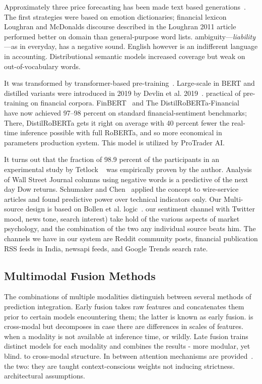 \documentclass[10pt,a4paper,twoside]{article}
\begin{document}
Approximately three price forecasting has been made text based
generations~\cite{bollen2011}. The first strategies were based on emotion
dictionaries; financial lexicon Loughran and McDonalds discourse described in the Loughran 2011 article~\cite{loughran2011}
performed better on domain than general-purpose word lists.
ambiguity---\emph{liability}---as in everyday, has a negative sound.
English however is an indifferent language in accounting. Distributional semantic models
increased coverage but weak on out-of-vocabulary words.

It was transformed by transformer-based pre-training~\cite{vaswani2017}.
Large-scale in BERT and distilled variants were introduced in 2019 by Devlin et al. 2019~\cite{devlin2019}.
practical of pre-training on financial corpora. FinBERT~\cite{araci2019} and
The DistilRoBERTa-Financial~\cite{liu2019} have now achieved 97--98 percent on standard
financial-sentiment benchmarks; There, DistilRoBERTa gets it right on average with 40 percent fewer
the real-time inference possible with full RoBERTa, and so more economical in parameters
production system. This model is utilized by ProTrader AI.

It turns out that the fraction of 98.9 percent of the participants in an experimental study by Tetlock ~\cite{tetlock2007} was empirically proven by the author.
Analysis of Wall Street Journal columns using negative words is a predictive of the next day Dow returns.
Schumaker and Chen~\cite{schumaker2009} applied the concept to wire-service
articles and found predictive power over technical indicators only. Our
Multi-source design is based on Bollen et al. logic~\cite{bollen2011}.
our sentiment channel with Twitter mood, news tone,
search interest) take hold of the various aspects of market psychology, and the combination of the two
any individual source beats him. The channels we have in our system are Reddit community
posts, financial publication RSS feeds in India, newsapi feeds, and
Google Trends search rate.

\subsection{Multimodal Fusion Methods}

The combinations of multiple modalities distinguish between several methods of prediction integration.
Early fusion takes raw features and concatenates them prior to certain models encountering them; the latter is known as early fusion.
is cross-modal but decomposes in case there are differences in scales of features.
when a modality is not available at inference time, or wildly. Late fusion trains
distinct models for each modality and combines the results - more modular, yet blind.
to cross-modal structure. In between attention mechanisms are provided~\cite{vaswani2017}.
the two: they are taught context-conscious weights not inducing strictness.
architectural assumptions.
\end{document}
